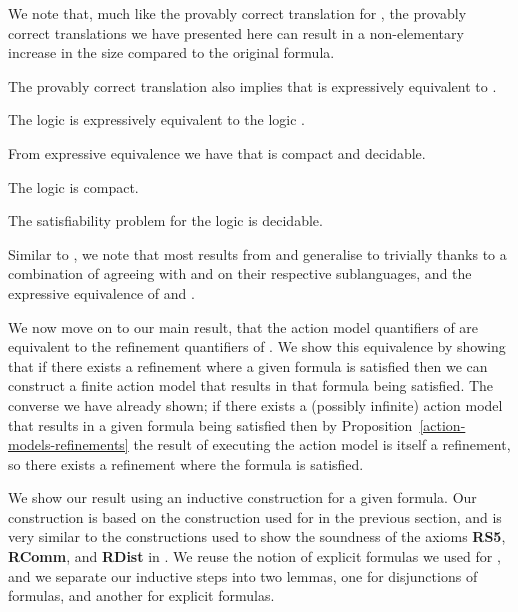 We note that, much like the provably correct translation for \logicRmlS{}, the provably correct translations we have presented here can result in a non-elementary increase in the size compared to the original formula.

The provably correct translation also implies that \logicRamlS{} is expressively equivalent to \logicS{}.

\begin{corollary}\label{raml-s5-expressive-equivalence}
The logic \logicRamlS{} is expressively equivalent to the logic \logicS{}.
\end{corollary}

From expressive equivalence we have that \logicRmlS{} is compact and decidable.

\begin{corollary}
The logic \logicRamlS{} is compact.
\end{corollary}

\begin{corollary}
The satisfiability problem for the logic \logicRamlS{} is decidable.
\end{corollary}

Similar to \logicRamlK{}, we note that most results from \logicAmlS{} and \logicRmlS{} generalise to \logicRamlS{} trivially thanks to a combination of \logicRamlS{} agreeing with \logicAmlS{} and \logicRmlS{} on their respective sublanguages, and the expressive equivalence of \logicRamlS{} and \logicS{}.

We now move on to our main result, that the action model quantifiers of \logicAamlS{} are equivalent to the refinement quantifiers of \logicRmlS{}.
We show this equivalence by showing that if there exists a refinement where a given formula is satisfied then we can construct a finite action model that results in that formula being satisfied.
The converse we have already shown; if there exists a (possibly infinite) action model that results in a given formula being satisfied then by Proposition~\ref{action-models-refinements} the result of executing the action model is itself a refinement, so there exists a refinement where the formula is satisfied.

We show our result using an inductive construction for a given formula.
Our construction is based on the construction used for \logicRamlK{} in the previous section, and is very similar to the constructions used to show the soundness of the axioms {\bf RS5}, {\bf RComm}, and {\bf RDist} in \logicRmlS{}.
We reuse the notion of explicit formulas we used for \logicRmlS{}, and we separate our inductive steps into two lemmas, one for disjunctions of formulas, and another for explicit formulas.

